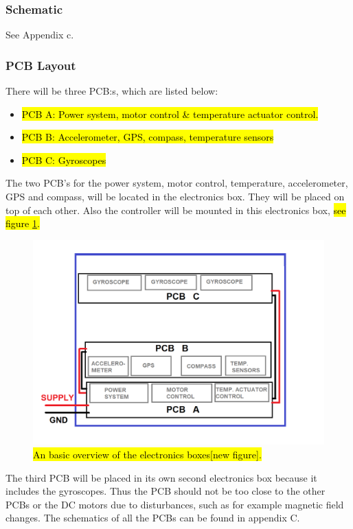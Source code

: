 
\subsubsection{Schematic}
See Appendix c.

\subsubsection{PCB Layout}
There will be three PCB:s, which are listed below:

\begin{itemize}
	\item 	\hl{PCB A: Power system, motor control \& temperature actuator control.}
	\item	\hl{PCB B: Accelerometer, GPS, compass, temperature sensors}
	\item 	\hl{PCB C: Gyroscopes}
\end{itemize}



The two PCB's for the power system, motor control, temperature, accelerometer, GPS and compass, will be located in the electronics box. They will be placed on top of each other. Also the controller will be mounted in this electronics box, \hl{see figure {\ref{fig:electronic-box}}.}

\begin{figure}[H]
	\centering
	\includegraphics[scale=0.5]{4-experiment-design/img/electrical/ElectricalBox.png}
	\caption{\hl{An basic overview of the electronics boxes[new figure].}}
	\label{fig:electronic-box}
\end{figure}


The third PCB will be placed in its own second electronics box because it includes the gyroscopes. Thus the PCB should not be too close to the other PCBs or the DC motors due to disturbances, such as for example magnetic field changes. The schematics of all the PCBs can be found in appendix C.
\raggedbottom
